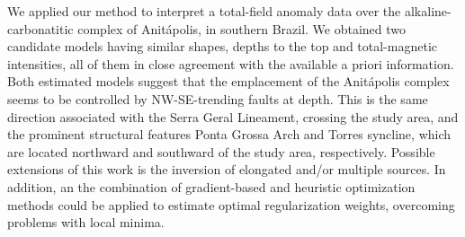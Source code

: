 We applied our method to interpret a total-field anomaly data over the 
alkaline-carbonatitic complex of Anit{\'a}polis, in southern Brazil. 
We obtained two candidate models having similar shapes, depths to the top and 
total-magnetic intensities, all of them in close agreement with the available 
a priori information. Both estimated models suggest that the emplacement of the 
Anit{\'a}polis complex seems to be controlled by NW-SE-trending faults at depth.
This is the same direction associated with the Serra Geral Lineament, 
crossing the study area, and the prominent structural features 
Ponta Grossa Arch and Torres syncline, which are located 
northward and southward of the study area, respectively.
Possible extensions of this work is the inversion of elongated and/or multiple 
sources. In addition, an the combination of gradient-based and heuristic optimization 
methods could be applied to estimate optimal regularization weights, 
overcoming problems with local minima.